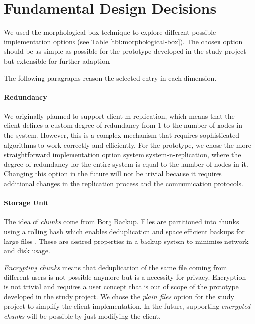\section{Fundamental Design Decisions}\label{sec:fundamental-design-decisions}

We used the morphological box technique to explore different possible implementation options (see Table \ref{tbl:morphological-box}). The chosen option should be as simple as possible for the prototype developed in the study project but extensible for further adaption.

The following paragraphs reason the selected entry in each dimension.

\paragraph{Redundancy}

We originally planned to support \gls{client-m-replication}, which means that the \gls{client} defines a custom degree of redundancy from 1 to the number of \glspl{node} in the system. However, this is a complex mechanism that requires sophisticated algorithms to work correctly and efficiently. For the prototype, we chose the more straightforward implementation option system \gls{system-n-replication}, where the degree of redundancy for the entire system is equal to the number of \glspl{node} in it. Changing this option in the future will not be trivial because it requires additional changes in the replication process and the communication protocols.

\paragraph{Storage Unit}
The idea of \emph{chunks} come from Borg Backup. Files are partitioned into chunks using a rolling hash which enables deduplication and space efficient backups for large files \cite{borg-data-structures}. These are desired properties in a backup system to minimise network and disk usage.

\emph{Encrypting chunks} means that deduplication of the same file coming from different users is not possible anymore but is a necessity for privacy. Encryption is not trivial and requires a user concept that is out of scope of the prototype developed in the study project.
We chose the \emph{plain files} option for the study project to simplify the \gls{client} implementation. In the future, supporting \emph{encrypted chunks} will be possible by just modifying the \gls{client}.

